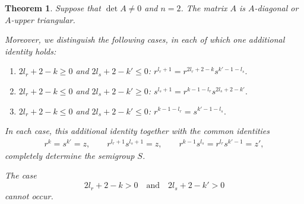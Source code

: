 \documentclass[11pt,reqno]{amsart}
\theoremstyle{plain}
\newtheorem{thm}{Theorem}[section]
\theoremstyle{remark}
\theoremstyle{definition}
\begin{document}
\begin{thm}\label{l_sAdd1L_2Add1}
Suppose that $\det A\neq0$ and $n=2$.
The matrix $A$ is $A$-diagonal or $A$-upper triangular.

Moreover, we distinguish the following cases, in each of which one additional identity holds:
\begin{enumerate}
\item[(i)] $2l_r+2-k \geq 0$ and $2l_s+2-k' \leq 0$:
\(
r^{l_r+1} = r^{2l_r+2-k}s^{k'-1-l_s}.
\)
\item[(ii)] $2l_r+2-k \leq 0$ and $2l_s+2-k' \geq 0$:
\(
s^{l_s+1} = r^{k-1-l_r}s^{2l_s+2-k'}.
\)
\item[(iii)] $2l_r+2-k \leq 0$ and $2l_s+2-k' \leq 0$:
\(
r^{k-1-l_r} = s^{k'-1-l_s}.
\)
\end{enumerate}
In each case, this additional identity together with the common identities
\begin{align*}
r^k = s^{k'} = z,\qquad
r^{l_r+1}s^{l_s+1} = z,\qquad
r^{k-1}s^{l_s} = r^{l_r}s^{k'-1} = z',
\end{align*}
completely determine the semigroup $S$.

The case
\[
2l_r+2-k > 0
\quad \text{and} \quad
2l_s+2-k' > 0
\]
cannot occur.
\end{thm}
\end{document}
